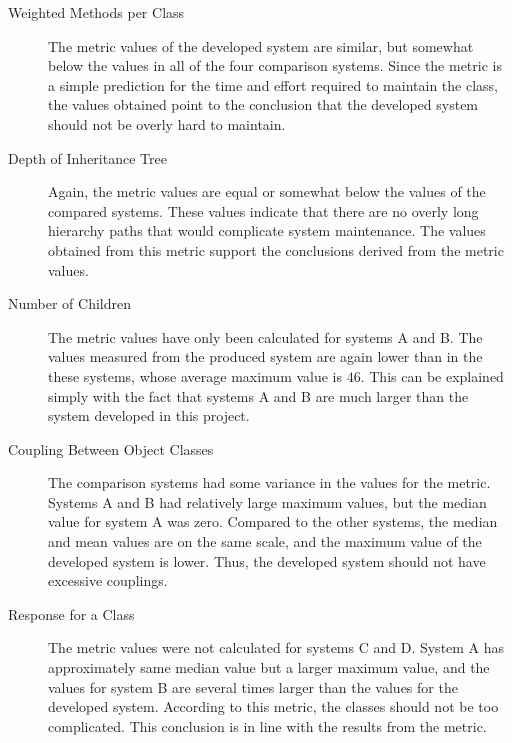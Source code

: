 \begin{description}

\item[Weighted Methods per Class] The  metric values of 
the developed system are similar, but somewhat below the values in all 
of the four comparison systems. Since the  metric is a 
simple prediction for the time and effort required to maintain the 
class, the values obtained point to the conclusion that the developed 
system should not be overly hard to maintain.

\item[Depth of Inheritance Tree] Again, the  metric values 
are equal or somewhat below the values of the compared systems. These 
values indicate that there are no overly long hierarchy paths that 
would complicate system maintenance. The values obtained from this 
metric support the conclusions derived from the  metric 
values.

\item[Number of Children] The  metric values have only 
been calculated for systems A and B. The values measured from the 
produced system are again lower than in the these systems, whose 
average maximum value is $46$. This can be explained simply with the 
fact that systems A and B are much larger than the system developed in 
this project.

\item[Coupling Between Object Classes] The comparison systems had some 
variance in the values for the  metric. Systems A and B 
had relatively large maximum values, but the median value for system A 
was zero. Compared to the other systems, the median and mean values 
are on the same scale, and the maximum value of the developed system 
is lower. Thus, the developed system should not have excessive 
couplings.

\item[Response for a Class] The  metric values were not 
calculated for systems C and D. System A has approximately same median 
value but a larger maximum value, and the  values for 
system B are several times larger than the values for the developed 
system. According to this metric, the classes should not be too 
complicated. This conclusion is in line with the results from the 
 metric.


\end{description}
